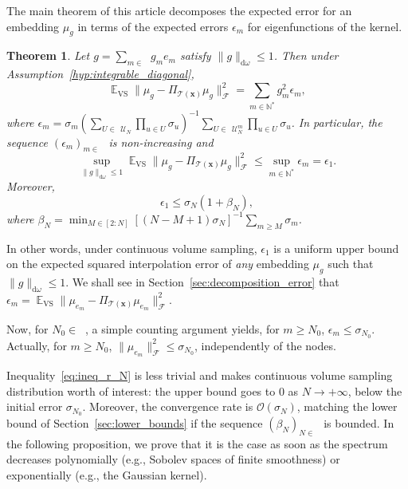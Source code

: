\documentclass[twoside,11pt]{book}
\newtheorem{theorem}{Theorem}
\numberwithin{theorem}{chapter}
\numberwithin{definition}{chapter}
\numberwithin{proposition}{chapter}
\numberwithin{corollary}{chapter}
\numberwithin{example}{chapter}
\numberwithin{lemma}{chapter}
\DeclareMathOperator{\Span}{\mathrm{Span}}
\DeclareMathOperator{\VS}{\mathrm{VS}}
\DeclareMathOperator{\EX}{\mathbb{E}}
\DeclareMathOperator{\F}{\mathcal{F}}
\DeclareMathOperator{\Ns}{\mathbb{N}^{*}}
\def\UN{\:\mathcal{U}_N}
\def\UNm{\:\mathcal{U}_N^m}
\begin{document}
The main theorem of this article decomposes the expected error for an embedding $\mu_g$ in terms of the expected errors $\epsilon_m$ for eigenfunctions of the kernel.
\begin{theorem}\label{thm:main_result_1}
Let $\displaystyle g = \sum\limits_{m\in \Ns} g_m e_m$ satisfy $\| g\|_{\mathrm{d}\omega} \leq 1$.  Then under Assumption~\ref{hyp:integrable_diagonal},
\begin{equation}\label{eq:main_result_EX_VS_err_mu}
\EX_{\VS} \|\mu_{g} - \Pi_{\mathcal{T}(\bm{x})} \mu_{g}\|_{\F}^{2} = \sum\limits_{m \in \mathbb{N}^{*}} g_{m}^{2} \epsilon_{m},
\end{equation}
where $\epsilon_{m} = \sigma_{m} \left(\sum\limits_{ U \in \: \UN} \prod\limits_{u \in U} \sigma_{u} \right)^{-1}  \sum\limits_{  U \in \: \UNm} \prod\limits_{u \in U} \sigma_{u}$.
In particular, the sequence $(\epsilon_m)_{m \in \Ns}$ is non-increasing and
\begin{equation}\label{eq:upper_bound_sup_epsilon}
\sup_{\| g\|_{\mathrm{d}\omega} \leq 1} \EX_{\VS} \|\mu_{g} - \Pi_{\mathcal{T}(\bm{x})} \mu_{g}\|_{\F}^{2} \leq \sup\limits_{m \in \mathbb{N}^{*}} \epsilon_{m} = \epsilon_1.
\end{equation}
Moreover,
\begin{equation}\label{eq:ineq_r_N}
\epsilon_{1} \leq \sigma_{N} \left(1+ \beta_{N}\right),
\end{equation}
where $\displaystyle \beta_{N} = \min_{M \in [2:N]} \left[(N-M+1)\sigma_N\right]^{-1} \sum_{m \geq M} \sigma_m$.
\end{theorem}

In other words, under continuous volume sampling, $\epsilon_{1}$ is a uniform upper bound on the expected squared interpolation error of \emph{any} embedding $\mu_{g}$ such that $\|g\|_{\mathrm{d}\omega} \leq 1$. We shall see in Section~\ref{sec:decomposition_error} that $\epsilon_m = \EX_{\VS} \|\mu_{e_{m}} - \Pi_{\mathcal{T}(\bm{x})} \mu_{e_{m}}\|_{\F}^{2}$.

Now, for $N_{0} \in \Ns$, a simple counting argument yields, for $m \geq N_{0}$, $\epsilon_{m} \leq \sigma_{N_{0}}$. Actually, for $m \geq N_{0}$, $\|\mu_{e_{m}}\|_{\F}^{2} \leq \sigma_{N_{0}}$, independently of the nodes.


%
Inequality~\eqref{eq:ineq_r_N} is less trivial and makes continuous volume sampling distribution worth of interest: the upper bound goes to $0$ as $N \rightarrow +\infty$, below the initial error $\sigma_{N_0}$.
 Moreover, the convergence rate is $\mathcal{O}(\sigma_{N})$, matching the lower bound of Section~\ref{sec:lower_bounds} if the sequence $(\beta_{N})_{N \in \Ns}$ is bounded. In the following proposition, we prove that it is the case as soon as the spectrum decreases polynomially (e.g., Sobolev spaces of finite smoothness) or exponentially (e.g., the Gaussian kernel).
\end{document}
